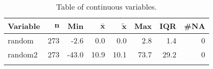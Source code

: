 {\footnotesize
\begin{longtable}{lrrrrrrr}
\caption{Table of continuous variables.} \\ 
 \textbf{Variable} & $\mathbf{n}$ & \textbf{Min} & $\mathbf{\bar{x}}$ & $\mathbf{\widetilde{x}}$ & \textbf{Max} & \textbf{IQR} & \textbf{\#NA} \\ 
  \hline
random & 273 &  -2.6 &  0.0 &  0.0 &  2.8 &  1.4 & 0 \\ 
  random2 & 273 & -43.0 & 10.9 & 10.1 & 73.7 & 29.2 & 0 \\ 
  \hline
\label{tab:table4}
\end{longtable}
}
